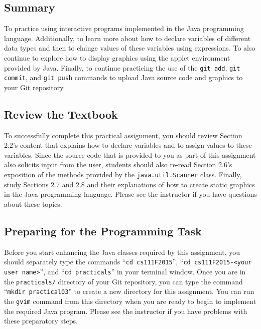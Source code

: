 


\subsection*{Summary}

To practice using interactive programs implemented in the Java programming language. Additionally, to learn more about
how to declare variables of different data types and then to change values of these variables using expressions.  To
also continue to explore how to display graphics using the applet environment provided by Java. Finally, to continue
practicing the use of the {\tt git add}, {\tt git commit}, and {\tt git push} commands to upload Java source code and
graphics to your Git repository.

\vspace*{-.1in}
\subsection*{Review the Textbook}

To successfully complete this practical assignment, you should review Section 2.2's content that explains how to declare
variables and to assign values to these variables. Since the source code that is provided to you as part of this
assignment also solicits input from the user, students should also re-read Section 2.6's exposition of the methods
provided by the {\tt java.util.Scanner} class. Finally, study Sections 2.7 and 2.8 and their explanations of how to
create static graphics in the Java programming language.  Please see the instructor if you have questions about
these topics.

\vspace*{-.1in}
\subsection*{Preparing for the Programming Task}

Before you start enhancing the Java classes required by this assignment, you should separately type the commands ``{\tt cd
  cs111F2015}'', ``{\tt cd cs111F2015-<your user name>}'', and ``{\tt cd practicals}'' in your terminal window. Once you
are in the {\tt practicals/} directory of your Git repository, you can type the command ``{\tt mkdir practical03}'' to
create a new directory for this assignment. You can run the {\tt gvim} command from this directory when you are ready to
begin to implement the required Java program. Please see the instructor if you have problems with these preparatory steps.


